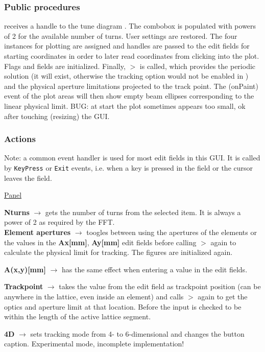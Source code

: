 \documentclass[12pt]{article}
\newcommand\code[1]{{\tt #1}}
\newcommand{\ofld}[1]{\colorbox{black!15}{{{\color{black}\bf #1}}}}
\newcommand{\ofldx}[1]{\colorbox{black!15}{{\color{black}(#1)}}}
\newcommand\guico[1]{{\color{blue}\code{#1}}}
\newcommand{\unico}[1]{{\color{burntorange}\code{#1}}}
\newcommand{\evcod}[2]{\ofld{#1} $\rightarrow$ \guico{#2}}
\newcommand{\prcod}[2]{\opauni{#1}$>$\unico{#2}}
\newcommand{\opagui}[1]{\colorbox{blue!20}{{\color{black}\code{#1}}}}
\newcommand{\ogui}[1]{\hyperref[#1]{\opagui{#1}}}
\newcommand{\opaguif}[1]{\colorbox{violet!30}{{\color{black}\code{#1}}}}
\newcommand{\oguif}[1]{\hyperref[#1]{\opaguif{#1}}}
\newcommand{\opauni}[1]{\colorbox{orange!30}{{\color{black}\code{#1}}}}
\newcommand{\act}[1]{\subsubsection*{Actions} #1}
\newcommand{\ppro}[1]{\subsubsection*{Public procedures} #1}
\newcommand{\todo}[1]{{\color{red} #1}}
\begin{document}
\ppro{
\guico{Start} receives a handle to the tune diagram \ogui{opatunediag}. The combobox \guico{comTurns} is populated with powers of 2 for the available number of turns. User settings are restored. The four \oguif{comfigureframe} instances for plotting are assigned and handles are passed to the edit fields for starting coordinates in order to later read coordinates from clicking into the plot. Flags and fields are initialized. Finally, \prcod{tracklib}{Initdpp} is called, which provides the periodic solution (it will exist, otherwise the tracking option would not be enabled in \ogui{opamenu}) and the physical aperture limitations projected to the track point. The \ofldx{onPaint} event of the plot areas will then show empty beam ellipses corresponding to the linear physical limit. \todo{BUG: at start the plot sometimes appears too small, ok after touching (resizing) the GUI.}
}

\act{}

Note: a common event handler \guico{ediAction} is used for most edit fields in this GUI. It is called by \code{KeyPress} or \code{Exit} events, i.e. when a key is pressed in the field or the cursor leaves the field.


\underline{Panel \guico{PanParam}}

\evcod{Nturns}{comTurnsChange} gets the number of turns from the selected item. It is always a power of 2 as required by the FFT.\\[1ex]

\evcod{Element apertures}{cbxElAperClick} toogles between using the apertures of the elements or the values in the \ofld{Ax[mm]}, \ofld{Ay[mm]} edit fields before calling \prcod{tracklib}{Initdpp} again to calculate the physical limit for tracking. The \guico{psx,psy} figures are initialized again.

\evcod{A(x,y)[mm]}{ediAction[edi(x,y)aper]} has the same effect when entering a value in the edit fields. 

\evcod{Trackpoint}{ediAction[edistartpos]} takes the value from the edit field as trackpoint position (can be anywhere in the lattice, even inside an element) and calls \prcod{tracklib}{Initdpp} again to get the optics and aperture limit at that location. Before the input is checked to be within the length of the active lattice segment.

\evcod{4D}{butT6Click} sets tracking mode from 4- to 6-dimensional and changes the button caption. \todo{Experimental mode, incomplete implementation!}\\[1ex]
\end{document}
